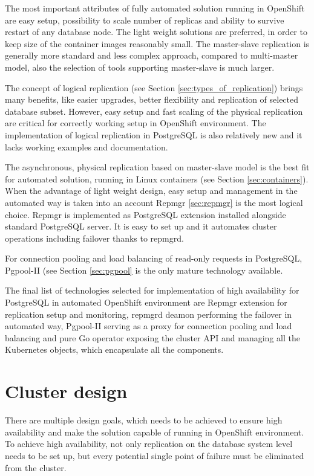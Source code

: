 \documentclass[
  digital, %
  twoside, %
  table,   %
  lof,     %
  lot,     %
]{fithesis3}
\begin{document}
The most important attributes of fully automated solution running in OpenShift are easy setup, possibility to scale number of replicas and ability to survive restart of any database node. The light weight solutions are preferred, in order to keep size of the container images reasonably small. The master-slave replication is generally more standard and less complex approach, compared to multi-master model, also the selection of tools supporting master-slave is much larger.

The concept of logical replication (see Section \ref{sec:types_of_replication}) brings many benefits, like easier upgrades, better flexibility and replication of selected database subset. However, easy setup and fast scaling of the physical replication are critical for correctly working setup in OpenShift environment. The implementation of logical replication in PostgreSQL is also relatively new and it lacks working examples and documentation.

The asynchronous, physical replication based on master-slave model is the best fit for automated solution, running in Linux containers (see Section \ref{sec:containers}). When the advantage of light weight design, easy setup and management in the automated way is taken into an account Repmgr \ref{sec:repmgr} is the most logical choice. Repmgr is implemented as PostgreSQL extension installed alongside standard PostgreSQL server. It is easy to set up and it automates cluster operations including failover thanks to repmgrd.

For connection pooling and load balancing of read-only requests in PostgreSQL, Pgpool-II (see Section \ref{sec:pgpool} is the only mature technology available.

The final list of technologies selected for implementation of high availability for PostgreSQL in automated OpenShift environment are Repmgr extension for replication setup and monitoring, repmgrd deamon performing the failover in automated way, Pgpool-II serving as a proxy for connection pooling and load balancing and pure Go operator exposing the cluster API and managing all the Kubernetes objects, which encapsulate all the components.

\section{Cluster design}
There are multiple design goals, which needs to be achieved to ensure high availability and make the solution capable of running in OpenShift environment. To achieve high availability, not only replication on the database system level needs to be set up, but every potential single point of failure must be eliminated from the cluster.
\end{document}
